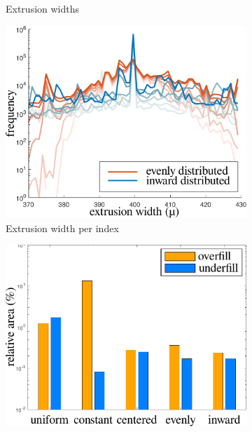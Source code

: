 \begin{figure}
\begin{subfigure}{\figwidth}
\caption{Extrusion widths}
\label{widthHistogram}
\end{subfigure}
\begin{subfigure}{\figwidth}\centering
\includegraphics[height=\figheight]{sources-validation-indexedwidths2.pdf}
\caption{Extrusion width per index}
\label{widthIndexedHistogram}
\end{subfigure}
\begin{subfigure}{\figwidth}\centering
\includegraphics[height=\figheight]{sources-validation-overunderfill.pdf}

\end{subfigure}
\end{figure}
